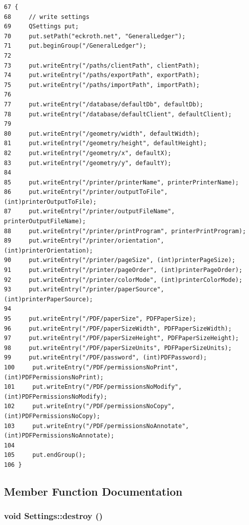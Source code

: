 \footnotesize\begin{verbatim}67 {
68     // write settings
69     QSettings put;
70     put.setPath("eckroth.net", "GeneralLedger");
71     put.beginGroup("/GeneralLedger");
72 
73     put.writeEntry("/paths/clientPath", clientPath);
74     put.writeEntry("/paths/exportPath", exportPath);
75     put.writeEntry("/paths/importPath", importPath);
76 
77     put.writeEntry("/database/defaultDb", defaultDb);
78     put.writeEntry("/database/defaultClient", defaultClient);
79 
80     put.writeEntry("/geometry/width", defaultWidth);
81     put.writeEntry("/geometry/height", defaultHeight);
82     put.writeEntry("/geometry/x", defaultX);
83     put.writeEntry("/geometry/y", defaultY);
84 
85     put.writeEntry("/printer/printerName", printerPrinterName);
86     put.writeEntry("/printer/outputToFile", (int)printerOutputToFile);
87     put.writeEntry("/printer/outputFileName", printerOutputFileName);
88     put.writeEntry("/printer/printProgram", printerPrintProgram);
89     put.writeEntry("/printer/orientation", (int)printerOrientation);
90     put.writeEntry("/printer/pageSize", (int)printerPageSize);
91     put.writeEntry("/printer/pageOrder", (int)printerPageOrder);
92     put.writeEntry("/printer/colorMode", (int)printerColorMode);
93     put.writeEntry("/printer/paperSource", (int)printerPaperSource);
94 
95     put.writeEntry("/PDF/paperSize", PDFPaperSize);
96     put.writeEntry("/PDF/paperSizeWidth", PDFPaperSizeWidth);
97     put.writeEntry("/PDF/paperSizeHeight", PDFPaperSizeHeight);
98     put.writeEntry("/PDF/paperSizeUnits", PDFPaperSizeUnits);
99     put.writeEntry("/PDF/password", (int)PDFPassword);
100     put.writeEntry("/PDF/permissionsNoPrint", (int)PDFPermissionsNoPrint);
101     put.writeEntry("/PDF/permissionsNoModify", (int)PDFPermissionsNoModify);
102     put.writeEntry("/PDF/permissionsNoCopy", (int)PDFPermissionsNoCopy);
103     put.writeEntry("/PDF/permissionsNoAnnotate", (int)PDFPermissionsNoAnnotate);
104 
105     put.endGroup();
106 }
\end{verbatim}\normalsize 




\subsection{Member Function Documentation}
\hypertarget{classSettings_a0}{
\subsubsection[destroy]{\setlength{\rightskip}{0pt plus 5cm}void Settings::destroy ()}}
\label{classSettings_a0}


